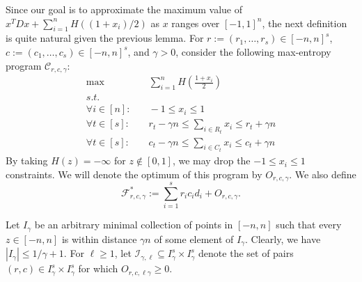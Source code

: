 \documentclass[final, 12pt]{colt2018}
\newcommand{\F}{\mathcal{F}}
\newcommand{\I}{\mathcal{I}}
\theoremstyle{definition}
\theoremstyle{plain}
\begin{document}
Since our goal is to approximate the maximum value of $x^{T}Dx + \sum_{i=1}^{n}H((1+x_i)/2)$ as $x$ ranges over $[-1,1]^{n}$, the next definition is quite natural given the previous lemma. For $r:=(r_1,\dots,r_s) \in [-n,n]^s$, $c:=(c_1,\dots,c_s)\in [-n,n]^s$, and $\gamma > 0$, consider the following max-entropy program $\mathcal{C}_{r,c,\gamma}$: 
\begin{align*}
\max & \quad \sum_{i=1}^{n}H\left(\frac{1+x_{i}}{2}\right)\\
s.t.\\
\forall i\in[n]: & \quad -1\leq x_{i}\leq1 \\
\forall t\in[s]: & \quad r_{t}-\gamma n\leq\sum_{i\in R_{t}}x_{i}\leq r_{t}+\gamma n\\
\forall t\in[s]: & \quad c_{t}-\gamma n\leq\sum_{i\in C_{t}}x_{i}\leq c_{t}+\gamma n
\end{align*}
By taking $H(z) = -\infty$ for $z\notin [0,1]$, we may drop the $-1\leq x_i \leq 1$ constraints. We will denote the optimum of this program by $O_{r,c, \gamma}$. We also define 
$$\F^*_{r,c,\gamma}:= \sum_{i=1}^{s}r_ic_id_i + O_{r,c,\gamma}.$$

Let $I_\gamma$ be an arbitrary minimal collection of points in $[-n,n]$ such that every $z \in [-n,n]$ is within distance $\gamma n$ of some element of $I_\gamma$. Clearly, we have $|I_{\gamma}| \le 1/\gamma + 1$. For $\ell \geq 1$, let $\I_{\gamma,\ell} \subseteq I_{\gamma}^{s}\times I_{\gamma}^{s}$ denote the set of pairs $(r,c)\in I_{\gamma}^{s}\times I_{\gamma}^{s}$ for which $O_{r,c,\ell \gamma} \geq 0$.    
\end{document}
